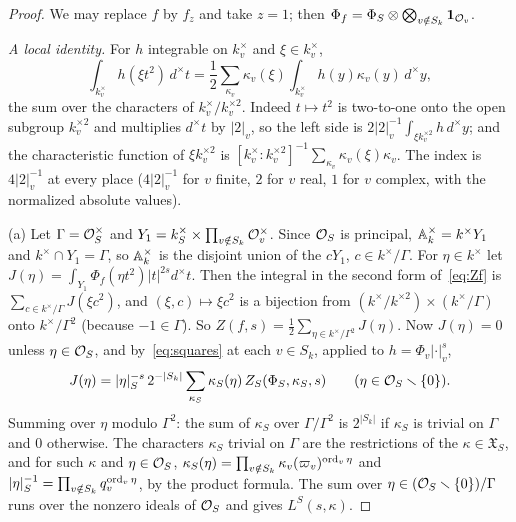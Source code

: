 \begin{proof}
We may replace $f$ by $f_z$ and take $z=1$; then $\Phi_f=\Phi_S\otimes
\bigotimes_{v\notin S_k}\mathbf 1_{\mathcal{O}_v}$.

\emph{A local identity.} For $h$ integrable on $k_v^\times$ and
$\xi\in k_v^\times$,
\begin{equation}\label{eq:squares}
\int_{k_v^\times}h(\xi t^2)\,d^\times t=\frac12\sum_{\kappa_v}\kappa_v(\xi)
\int_{k_v^\times}h(y)\kappa_v(y)\,d^\times y,
\end{equation}
the sum over the characters of $k_v^\times/k_v^{\times2}$. Indeed
$t\mapsto t^2$ is two-to-one onto the open subgroup $k_v^{\times2}$ and
multiplies $d^\times t$ by $|2|_v$, so the left side is
$2|2|_v^{-1}\int_{\xi k_v^{\times2}}h\,d^\times y$; and the characteristic
function of $\xi k_v^{\times2}$ is $[k_v^\times:k_v^{\times2}]^{-1}
\sum_{\kappa_v}\kappa_v(\xi)\kappa_v$. The index is $4|2|_v^{-1}$ at every
place ($4|2|_v^{-1}$ for $v$ finite, $2$ for $v$ real, $1$ for $v$
complex, with the normalized absolute values).

(a) Let $\Gamma=\mathcal{O}_S^\times$ and $Y_1=k_S^\times\times\prod_{v\notin S_k}
\mathcal{O}_v^\times$. Since $\mathcal{O}_S$ is principal, $\mathbb{A}_k^\times=k^\times Y_1$ and
$k^\times\cap Y_1=\Gamma$, so $\mathbb{A}_k^\times$ is the disjoint union of the
$cY_1$, $c\in k^\times/\Gamma$. For $\eta\in k^\times$ let
$J(\eta)=\int_{Y_1}\Phi_f(\eta t^2)|t|^{2s}d^\times t$. Then the integral
in the second form of~\eqref{eq:Zf} is $\sum_{c\in k^\times/\Gamma}J(\xi
c^2)$, and $(\xi,c)\mapsto\xi c^2$ is a bijection from
$(k^\times/k^{\times2})\times(k^\times/\Gamma)$ onto $k^\times/\Gamma^2$
(because $-1\in\Gamma$). So $Z(f,s)=\frac12\sum_{\eta\in k^\times/\Gamma^2}
J(\eta)$. Now $J(\eta)=0$ unless $\eta\in\mathcal{O}_S$, and
by~\eqref{eq:squares} at each $v\in S_k$, applied to $h=\Phi_v|\cdot|_v^s$,
\[
J(\eta)=|\eta|_S^{-s}\,2^{-|S_k|}\sum_{\kappa_S}\kappa_S(\eta)\,
Z_S(\Phi_S,\kappa_S,s)\qquad(\eta\in\mathcal{O}_S\smallsetminus\{0\}).
\]
Summing over $\eta$ modulo $\Gamma^2$: the sum of $\kappa_S$ over
$\Gamma/\Gamma^2$ is $2^{|S_k|}$ if $\kappa_S$ is trivial on $\Gamma$ and
$0$ otherwise. The characters $\kappa_S$ trivial on $\Gamma$ are the
restrictions of the $\kappa\in\mathfrak X_S$, and for such $\kappa$ and
$\eta\in\mathcal{O}_S$, $\kappa_S(\eta)=\prod_{v\notin S_k}\kappa_v(\varpi_v)^{
\operatorname{ord}_v\eta}$ and $|\eta|_S^{-1}=\prod_{v\notin S_k}q_v^{\operatorname{ord}_v\eta}$, by the
product formula. The sum over $\eta\in(\mathcal{O}_S\smallsetminus\{0\})/\Gamma$
runs over the nonzero ideals of $\mathcal{O}_S$ and gives $L^S(s,\kappa)$.


\end{proof}
